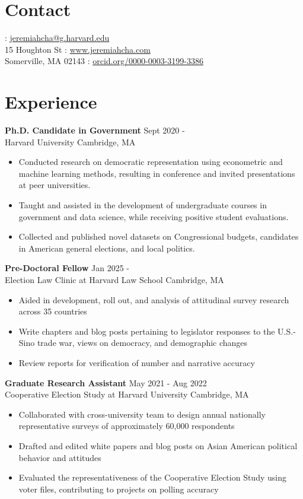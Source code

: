\documentclass[margin, line]{res}
\begin{document}
\begin{resume}

\section{Contact}
\mbox{} \hfill \Letter: \href{mailto:jeremiahcha@g.harvard.edu}{jeremiahcha@g.harvard.edu}\\
15 Houghton St \hfill \Mundus: \href{httsp://www.jeremiahcha.com}{www.jeremiahcha.com}\\
Somerville, MA 02143 \hfill \Mundus: \href{https://orcid.org/0000-0003-3199-3386}{orcid.org/0000-0003-3199-3386}

\section{Experience}
\textbf{Ph.D. Candidate in Government} \hfill Sept 2020 - \\
Harvard University \hfill Cambridge, MA
\begin{itemize}
	\item Conducted research on democratic representation using econometric and machine learning methods, resulting in conference and invited presentations at peer universities.
	\item Taught and assisted in the development of undergraduate courses in government and data science, while receiving positive student evaluations.
	\item Collected and published novel datasets on Congressional budgets, candidates in American general elections, and local politics.
\end{itemize}

\textbf{Pre-Doctoral Fellow} \hfill Jan 2025 -  \\
Election Law Clinic at Harvard Law School \hfill Cambridge, MA
\begin{itemize}
	\item Aided in development, roll out, and analysis of attitudinal survey research across 35 countries
	\item Write chapters and blog posts pertaining to legislator responses to the U.S.-Sino trade war, views on democracy, and demographic changes 
	\item Review reports for verification of number and narrative accuracy  
\end{itemize}

\textbf{Graduate Research Assistant} \hfill May 2021 - Aug 2022 \\
Cooperative Election Study at Harvard University \hfill Cambridge, MA
\begin{itemize}
	\item Collaborated with cross-university team to design annual nationally representative surveys of approximately 60,000 respondents
	\item Drafted and edited white papers and blog posts on Asian American political behavior and attitudes 
	\item Evaluated the representativeness of the Cooperative Election Study using voter files, contributing to projects on polling accuracy  
\end{itemize}


\end{resume}
\end{document}
